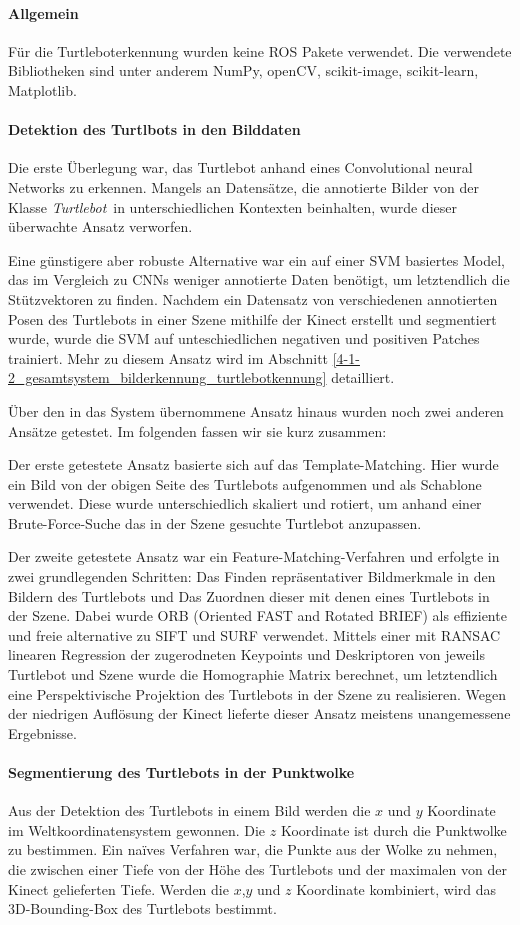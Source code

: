 \paragraph{Allgemein}
Für die Turtleboterkennung wurden keine ROS Pakete verwendet. Die verwendete Bibliotheken sind unter anderem NumPy, openCV, scikit-image, scikit-learn, Matplotlib.

\paragraph{Detektion des Turtlbots in den Bilddaten}
Die erste Überlegung war, das Turtlebot anhand eines Convolutional neural Networks zu erkennen. Mangels an Datensätze, die annotierte Bilder von der Klasse \textit{Turtlebot}\ in unterschiedlichen Kontexten beinhalten, wurde dieser überwachte Ansatz verworfen.

Eine günstigere aber robuste Alternative war ein auf einer SVM basiertes Model, das im Vergleich zu CNNs weniger annotierte Daten benötigt, um letztendlich die Stützvektoren zu finden. Nachdem ein Datensatz von verschiedenen annotierten Posen des Turtlebots in einer Szene mithilfe der Kinect erstellt und segmentiert wurde, wurde die SVM auf unteschiedlichen negativen und positiven Patches trainiert. Mehr zu diesem Ansatz wird im Abschnitt
\ref{4-1-2_gesamtsystem_bilderkennung_turtlebotkennung} detailliert.

Über den in das System übernommene Ansatz hinaus wurden noch zwei anderen Ansätze getestet. Im folgenden fassen wir sie kurz zusammen:

Der erste getestete Ansatz basierte sich auf das Template-Matching. Hier wurde ein Bild von der obigen Seite des Turtlebots aufgenommen und als Schablone verwendet. Diese wurde unterschiedlich skaliert und rotiert, um anhand einer Brute-Force-Suche das in der Szene gesuchte Turtlebot anzupassen.

Der zweite getestete Ansatz war ein Feature-Matching-Verfahren und erfolgte in zwei grundlegenden Schritten: Das Finden repräsentativer Bildmerkmale in den Bildern des Turtlebots und Das Zuordnen dieser mit denen eines Turtlebots in der Szene. Dabei wurde ORB (Oriented FAST and Rotated BRIEF) als effiziente und freie alternative zu SIFT und SURF verwendet. Mittels einer mit RANSAC linearen Regression der zugerodneten Keypoints und Deskriptoren von jeweils Turtlebot und Szene wurde die Homographie Matrix berechnet, um letztendlich eine Perspektivische Projektion des Turtlebots in der Szene zu realisieren. Wegen der niedrigen Auflösung der Kinect lieferte dieser Ansatz meistens unangemessene Ergebnisse.

\paragraph{Segmentierung des Turtlebots in der Punktwolke}
Aus der Detektion des Turtlebots in einem Bild werden die \(x\) und \(y\) Koordinate im Weltkoordinatensystem gewonnen. Die \(z\) Koordinate ist durch die Punktwolke zu bestimmen. Ein naïves Verfahren war, die Punkte aus der Wolke zu nehmen, die zwischen einer Tiefe von der Höhe des Turtlebots und der maximalen von der Kinect gelieferten Tiefe.
Werden die \(x\),\(y\) und \(z\) Koordinate kombiniert, wird das 3D-Bounding-Box des Turtlebots bestimmt.